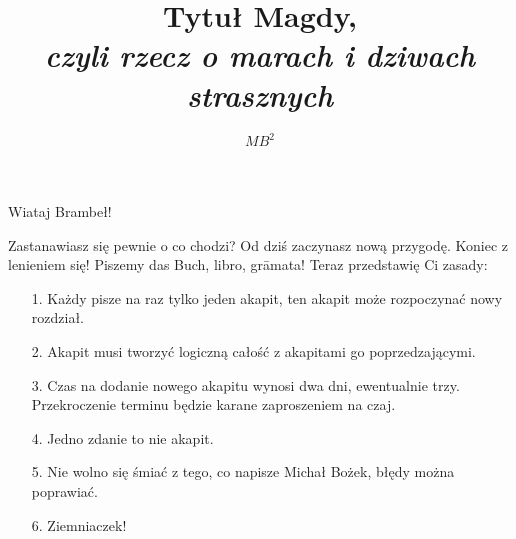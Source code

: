 \documentclass[12pt]{book}
\title{\textbf{Tytuł Magdy,} \\\textit{czyli rzecz o marach i dziwach strasznych}}
\author{$MB^2$}
\begin{document}
\maketitle
Wiataj Brambeł!\\\par
Zastanawiasz się pewnie o co chodzi? Od dziś zaczynasz nową przygodę. Koniec z lenieniem się! Piszemy das Buch, libro, gr\=amata! Teraz przedstawię Ci zasady:
\begin{itemize}
\item[1.]Każdy pisze na raz tylko jeden akapit, ten akapit może rozpoczynać nowy rozdział.
\item[2.]Akapit musi tworzyć logiczną całość z akapitami go poprzedzającymi.
\item[3.]Czas na dodanie nowego akapitu wynosi dwa dni, ewentualnie trzy. Przekroczenie terminu będzie karane zaproszeniem na czaj.
\item[4.]Jedno zdanie to nie akapit.
\item[5.]Nie wolno się śmiać z tego, co napisze Michał Bożek, błędy można poprawiać.
\item[6.]Ziemniaczek!
\end{itemize}
\end{document}
